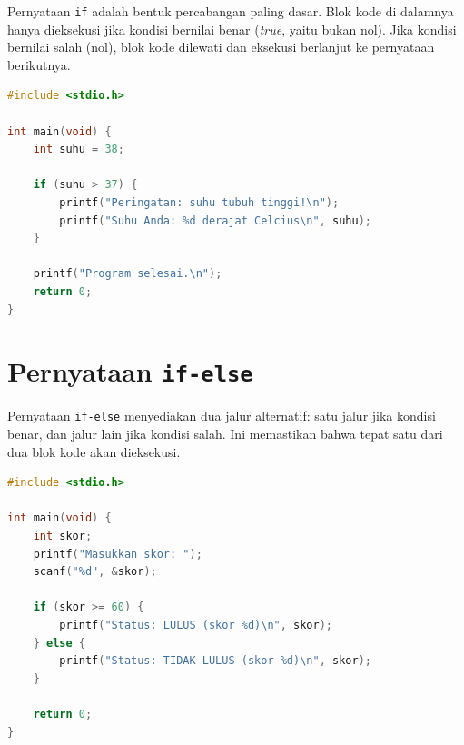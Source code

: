 \documentclass[../main.tex]{subfiles}
\begin{document}
Pernyataan \texttt{if} adalah bentuk percabangan paling dasar. Blok kode di dalamnya hanya dieksekusi jika kondisi bernilai benar (\textit{true}, yaitu bukan nol). Jika kondisi bernilai salah (nol), blok kode dilewati dan eksekusi berlanjut ke pernyataan berikutnya.

\begin{lstlisting}[language=C,caption=Pernyataan \texttt{if} sederhana]
#include <stdio.h>

int main(void) {
    int suhu = 38;
    
    if (suhu > 37) {
        printf("Peringatan: suhu tubuh tinggi!\n");
        printf("Suhu Anda: %d derajat Celcius\n", suhu);
    }
    
    printf("Program selesai.\n");
    return 0;
}
\end{lstlisting}



\section{Pernyataan \texttt{if-else}}

Pernyataan \texttt{if-else} menyediakan dua jalur alternatif: satu jalur jika kondisi benar, dan jalur lain jika kondisi salah. Ini memastikan bahwa tepat satu dari dua blok kode akan dieksekusi.

\begin{lstlisting}[language=C,caption=Pernyataan \texttt{if-else}]
#include <stdio.h>

int main(void) {
    int skor;
    printf("Masukkan skor: ");
    scanf("%d", &skor);
    
    if (skor >= 60) {
        printf("Status: LULUS (skor %d)\n", skor);
    } else {
        printf("Status: TIDAK LULUS (skor %d)\n", skor);
    }
    
    return 0;
}
\end{lstlisting}




\end{document}
